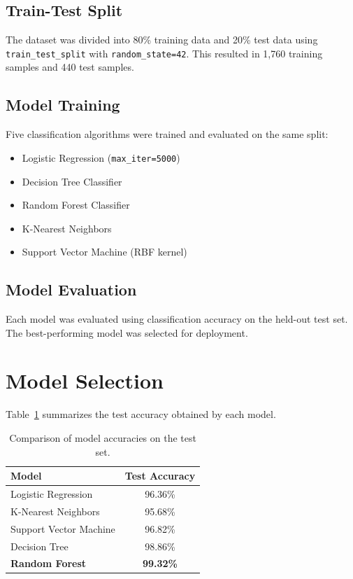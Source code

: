 \documentclass[11pt,a4paper]{article}
\begin{document}
\subsection{Train-Test Split}
The dataset was divided into 80\% training data and 20\% test data using \texttt{train\_test\_split} with \texttt{random\_state=42}. This resulted in 1{,}760 training samples and 440 test samples.

\subsection{Model Training}
Five classification algorithms were trained and evaluated on the same split:
\begin{itemize}
    \item Logistic Regression (\texttt{max\_iter=5000})
    \item Decision Tree Classifier
    \item Random Forest Classifier
    \item K-Nearest Neighbors
    \item Support Vector Machine (RBF kernel)
\end{itemize}

\subsection{Model Evaluation}
Each model was evaluated using classification accuracy on the held-out test set. The best-performing model was selected for deployment.

\section{Model Selection}

Table~\ref{tab:results} summarizes the test accuracy obtained by each model.

\begin{table}[H]
\centering
\begin{tabular}{lc}
\toprule
\textbf{Model} & \textbf{Test Accuracy} \\
\midrule
Logistic Regression & 96.36\% \\
K-Nearest Neighbors & 95.68\% \\
Support Vector Machine & 96.82\% \\
Decision Tree & 98.86\% \\
\textbf{Random Forest} & \textbf{99.32\%} \\
\bottomrule
\end{tabular}
\caption{Comparison of model accuracies on the test set.}
\label{tab:results}
\end{table}
\end{document}
